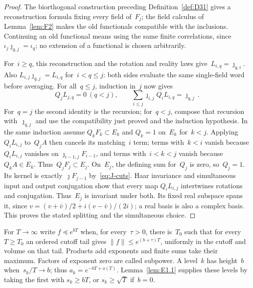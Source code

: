 \begin{proof}
The biorthogonal construction preceding Definition~\ref{def:D31} gives a reconstruction formula fixing every field of~$F_j$; the field calculus of Lemma~\ref{lem:F2} makes the old functionals compatible with the inclusions. Continuing an old functional means using the same finite correlations, since $\iota_j\jmath_{q,j}=\iota_q$; no extension of a functional is chosen arbitrarily.

For~$i\ge q$, this reconstruction and the rotation and reality laws give~$L_{i,q}=\jmath_{q,i}$. Also $L_{i,j}\jmath_{q,j}=L_{i,q}$ for~$i<q\le j$: both sides evaluate the same single-field word before averaging. For all~$q\le j$, induction in~$j$ now gives
\begin{equation}\label{eq:J-cuts}
Q_jL_{j,q}=0\ (q<j),\qquad
\sum_{i\le j}\jmath_{i,j}Q_iL_{i,q}=\jmath_{q,j}\,.
\end{equation}
For~$q=j$ the second identity is the recursion; for~$q<j$, compose that recursion with~$\jmath_{q,j}$ and use the compatibility just proved and the induction hypothesis. In the same induction assume $Q_kF_k\subset E_k$ and $Q_k=1$ on~$E_k$ for~$k<j$. Applying~$Q_iL_{i,j}$ to~$Q_jA$ then cancels its matching~$i$ term; terms with~$k<i$ vanish because $Q_iL_{i,j}$ vanishes on $\jmath_{i-1,j}F_{i-1}$, and terms with~$i<k<j$ vanish because~$Q_kA\in E_k$. Thus~$Q_jF_j\subset E_j$. On~$E_j$, the defining sum for~$Q_j$ is zero, so~$Q_j=1$. Its kernel is exactly~$\jmath F_{j-1}$ by~\eqref{eq:J-cuts}. Haar invariance and simultaneous input and output conjugation show that every map $Q_iL_{i,j}$ intertwines rotations and conjugation. Thus~$E_j$ is invariant under both. Its fixed real subspace spans it, since $v=(v+\bar v)/2+i(v-\bar v)/(2i)$; a real basis is also a complex basis. This proves the stated splitting and the simultaneous choice.
\end{proof}

For $T\to\infty$ write $f\preccurlyeq e^{bT}$ when, for every~$\tau>0$, there is~$T_0$ such that for every~$T\ge T_0$ an ordered cutoff tail gives $\|f\|\le e^{(b+\tau)T}$, uniformly in the cutoff and volume on that tail. Products add exponents and finite sums take their maximum. Factors of exponent zero are called subpower. A level~$k$ has height~$b$ when~$s_k/T\to b$; thus $a_k=e^{-bT+o(T)}$. Lemma~\ref{lem:E1.1} supplies these levels by taking the first with $s_k\ge bT$, or $s_k\ge\sqrt T$ if~$b=0$.

